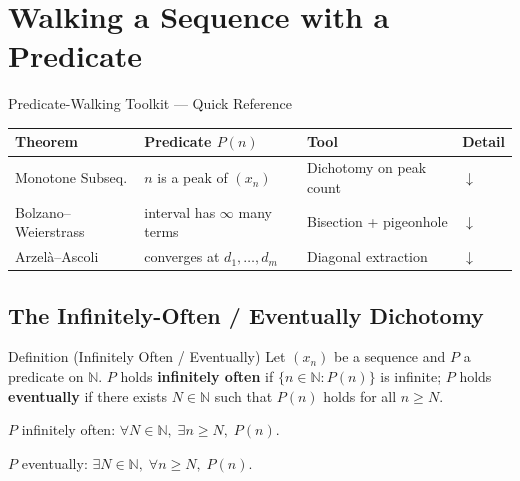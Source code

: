 
\section{Walking a Sequence with a Predicate}
\label{sec:predicate-walking}

\begin{toolkitbox}{Predicate-Walking Toolkit — Quick Reference}
\small
\begin{tabular}{l l l l}
\toprule
\textbf{Theorem} & \textbf{Predicate $P(n)$} & \textbf{Tool} & \textbf{Detail} \\
\midrule
Monotone Subseq.
  & $n$ is a peak of $(x_n)$
  & Dichotomy on peak count
  & \hyperref[thm:monotone-subsequence]{$\downarrow$} \\[3pt]
Bolzano--Weierstrass
  & interval has $\infty$ many terms
  & Bisection + pigeonhole
  & \hyperref[prop:bw-bisection]{$\downarrow$} \\[3pt]
Arzel\`a--Ascoli
  & converges at $d_1,\ldots,d_m$
  & Diagonal extraction
  & \hyperref[rem:arzela-ascoli]{$\downarrow$} \\
\bottomrule
\end{tabular}
\end{toolkitbox}

\subsection*{The Infinitely-Often / Eventually Dichotomy}
\label{subsec:io-ev-dichotomy}

\begin{definitionbox}{Definition (Infinitely Often / Eventually)}
\label{def:inf-often-eventually}
Let $(x_n)$ be a sequence and $P$ a predicate on $\mathbb{N}$. $P$ holds
\textbf{infinitely often} if $\{n\in\mathbb{N}:P(n)\}$ is infinite; $P$
holds \textbf{eventually} if there exists $N\in\mathbb{N}$ such that
$P(n)$ holds for all $n\geq N$.
\end{definitionbox}

\begin{remark}
$P$ infinitely often: $\forall N\in\mathbb{N},\;\exists n\geq N,\;P(n)$.

$P$ eventually: $\exists N\in\mathbb{N},\;\forall n\geq N,\;P(n)$.
\end{remark}

